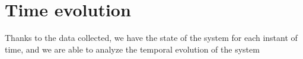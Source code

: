 \section{Time evolution}
Thanks to the data collected, we have the state of the system for each instant of time, and we are able to analyze the temporal evolution of the system